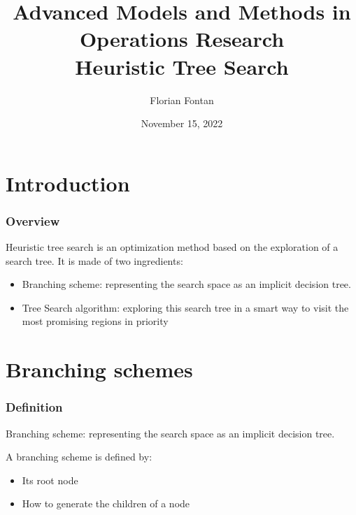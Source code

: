 \documentclass[10pt]{beamer}
\author{Florian Fontan}
\title{Advanced Models and Methods in Operations Research \\ Heuristic Tree Search}
\date{November 15, 2022}
\begin{document}
\newcommand{\customcite}[1]{\citetitle{#1}, \citeauthor{#1}, \citeyear{#1}}


\maketitle

\section{Introduction}

\begin{frame}
  \frametitle{Overview}

  Heuristic tree search is an optimization method based on the exploration of a search tree. It is made of two ingredients: \pause
  \begin{itemize}
    \item Branching scheme: representing the search space as an implicit decision tree. \pause
    \item Tree Search algorithm: exploring this search tree in a smart way to visit the most promising regions in priority
  \end{itemize}
\end{frame}

\section{Branching schemes}

\begin{frame}
  \frametitle{Definition}

  Branching scheme: representing the search space as an implicit decision tree.

  \bigskip

  A branching scheme is defined by:
  \begin{itemize}
    \item Its root node
    \item How to generate the children of a node
  \end{itemize}
\end{frame}
\end{document}
